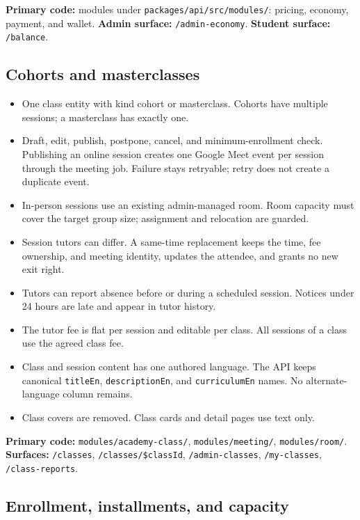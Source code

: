 \documentclass[11pt,a4paper]{article}
\newcommand{\code}[1]{\texttt{#1}}
\begin{document}
\noindent\textbf{Primary code:} modules under \code{packages/api/src/modules/}: pricing, economy, payment, and wallet. \textbf{Admin surface:} \code{/admin-economy}. \textbf{Student surface:} \code{/balance}.

\subsection{Cohorts and masterclasses}

\begin{itemize}
	\item One class entity with kind cohort or masterclass. Cohorts have multiple sessions; a masterclass has exactly one.
	\item Draft, edit, publish, postpone, cancel, and minimum-enrollment check. Publishing an online session creates one Google Meet event per session through the meeting job. Failure stays retryable; retry does not create a duplicate event.
	\item In-person sessions use an existing admin-managed room. Room capacity must cover the target group size; assignment and relocation are guarded.
	\item Session tutors can differ. A same-time replacement keeps the time, fee ownership, and meeting identity, updates the attendee, and grants no new exit right.
	\item Tutors can report absence before or during a scheduled session. Notices under 24 hours are late and appear in tutor history.
	\item The tutor fee is flat per session and editable per class. All sessions of a class use the agreed class fee.
	\item Class and session content has one authored language. The API keeps canonical \code{titleEn}, \code{descriptionEn}, and \code{curriculumEn} names. No alternate-language column remains.
	\item Class covers are removed. Class cards and detail pages use text only.
\end{itemize}

\noindent\textbf{Primary code:} \code{modules/academy-class/}, \code{modules/meeting/}, \code{modules/room/}. \textbf{Surfaces:} \code{/classes}, \code{/classes/\$classId}, \code{/admin-classes}, \code{/my-classes}, \code{/class-reports}.

\subsection{Enrollment, installments, and capacity}
\end{document}
